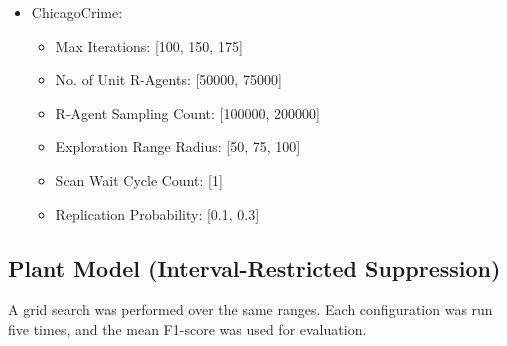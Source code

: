 \begin{itemize}
\begin{itemize}
    \end{itemize}
  \item ChicagoCrime:
    \begin{itemize}
      \item Max Iterations: [100, 150, 175]
      \item No. of Unit R-Agents: [50000, 75000]
      \item R-Agent Sampling Count: [100000, 200000]
      \item Exploration Range Radius: [50, 75, 100]
      \item Scan Wait Cycle Count: [1]
      \item Replication Probability: [0.1, 0.3]
    \end{itemize}
\end{itemize}

\subsection{Plant Model (Interval-Restricted Suppression)}
A grid search was performed over the same ranges. Each configuration was run five times, and the mean F1-score was used for evaluation. 
